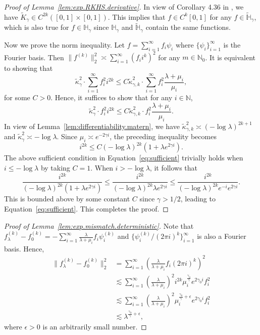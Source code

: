 \documentclass[12pt]{article}
\newcommand{\bbH}{\mathbb{H}}
\newcommand{\s}{\sum_{i=1}^{\infty}}
\theoremstyle{plain}
\theoremstyle{nonitalicremark}
\begin{document}
\begin{appendices}
\begin{proof}[Proof of Lemma~\ref{lem:exp.RKHS.derivative}]
In view of Corollary 4.36 in \cite{steinwart2008support}, we have $\tilde{K}_\gamma\in C^{2k}([0,1]\times[0,1])$. This implies that $f\in C^k[0,1]$ for any $f \in \tilde{\bbH}_\gamma$, which is also true for $f \in \bbH_\gamma$ since $\bbH_\gamma$ and $\tilde{\bbH}_\gamma$ contain the same functions.

Now we prove the norm inequality. Let $f=\s f_i\psi_i$ where $\{\psi_i\}_{i=1}^\infty$ is the Fourier basis. Then $\|f^{(k)}\|_2^2\asymp \s (f_i i^k)^2$ for any $m\in\mathbb{N}_0$. It is equivalent to showing that
\begin{equation}
\tilde{\kappa}_\gamma^2 \cdot \s f_i^2i^{2k} \leq C\tilde{\kappa}_{\gamma,k}^2 \cdot \s f_i^2\frac{\lambda+\mu_i}{\mu_i},
\end{equation}
for some $C>0$. Hence, it suffices to show that for any $i\in\mathbb{N}$,
\begin{equation}
\tilde{\kappa}_\gamma^2 \cdot f_i^2i^{2k}\leq C \tilde{\kappa}_{\gamma,k}^2 \cdot f_i^2\frac{\lambda+\mu_i}{\mu_i}.
\end{equation}
In view of Lemma~\ref{lem:differentiability.matern}, we have $\tilde{\kappa}_{\gamma,k}^2 \asymp (-\log\lambda)^{2k+1}$ and $\tilde{\kappa}_\gamma^2 \asymp -\log\lambda$. Since $\mu_i\asymp e^{-2\gamma i}$, the preceding inequality becomes
\begin{equation} \label{eq:sufficient} 
i^{2k}\leq C (-\log\lambda)^{2k} (1+\lambda e^{2\gamma i}).
\end{equation}
The above sufficient condition in Equation~\eqref{eq:sufficient} trivially holds when $i\leq -\log \lambda$ by taking $C=1$. When $i > -\log \lambda$, it follows that
\begin{equation}
\frac{i^{2k}}{(-\log\lambda)^{2k} (1+\lambda e^{2\gamma i})} \leq    \frac{i^{2k}}{(-\log\lambda)^{2k} \lambda e^{2\gamma i}} \leq \frac{i^{2k} }{(-\log\lambda)^{2k}e^{-i} e^{2\gamma i}}.
\end{equation}
This is bounded above by some constant $C$ since $\gamma > 1/2$, leading to Equation~\eqref{eq:sufficient}. This completes the proof.
\end{proof}


\begin{proof}[Proof of Lemma~\ref{lem:exp.mismatch.deterministic}]
Note that $f_\lambda^{(k)} - f_0^{(k)} = -\s \frac{\lambda}{\lambda + \mu_i} f_i \psi_i^{(k)}$ and $\{\psi_i^{(k)} / (2\pi i)^k\}_{i=1}^\infty$ is also a Fourier basis. Hence,
\begin{align}
\|f_\lambda^{(k)} - f_0^{(k)}\|_2^2 & = \s \left( \frac{\lambda}{\lambda + \mu_i} f_i (2\pi i)^k \right)^2\\
& \lesssim \s \left( \frac{\lambda}{\lambda + \mu_i} \right)^2  i^{2k} \mu_i^{\frac{\gamma_0}{\gamma}} e^{2\gamma_0 i} f_i^2\\
& \lesssim \s \left( \frac{\lambda}{\lambda + \mu_i} \right)^2  \mu_i^{\frac{\gamma_0}{\gamma}+\epsilon} e^{2\gamma_0 i} f_i^2\\
&\lesssim \lambda^{\frac{\gamma_0}{\gamma}+\epsilon},
\end{align}
where $\epsilon>0$ is an arbitrarily small number.


\end{proof}
\end{appendices}
\end{document}
